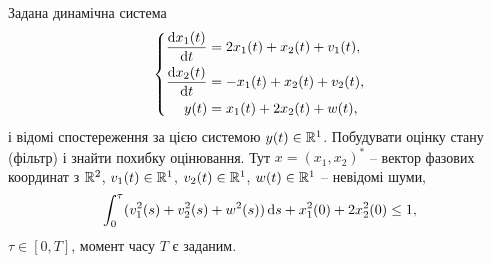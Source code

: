 \begin{problem}
	Задана динамічна система \[ \left\{ \begin{aligned}
		\frac{\mathop{}\!\mathrm{d} x_1(t)}{\mathop{}\!\mathrm{d} t} &= 2 x_1(t) + x_2(t) + v_1(t), \\
		\frac{\mathop{}\!\mathrm{d} x_2(t)}{\mathop{}\!\mathrm{d} t} &= - x_1(t) + x_2(t) + v_2(t), \\
		y(t) &= x_1(t) + 2 x_2(t) + w(t),
	\end{aligned} \right. \] і відомі спостереження за цією системою $y(t) \in \mathbb{R}^1$.  Побудувати оцінку стану (фільтр) і знайти похибку оцінювання. Тут $x = (x_1, x_2)^*$ -- вектор фазових координат з $\mathbb{R}^2$, $v_1 (t) \in \mathbb{R}^1$, $v_2 (t) \in \mathbb{R}^1$, $w(t) \in \mathbb{R}^1$ -- невідомі шуми, \[ \int_0^\tau (v_1^2(s) + v_2^2(s) + w^2(s)) \mathop{}\!\mathrm{d} s + x_1^2(0) + 2 x_2^2(0) \le 1,\] $\tau \in [0, T]$, момент часу $T$ є заданим.
\end{problem}

